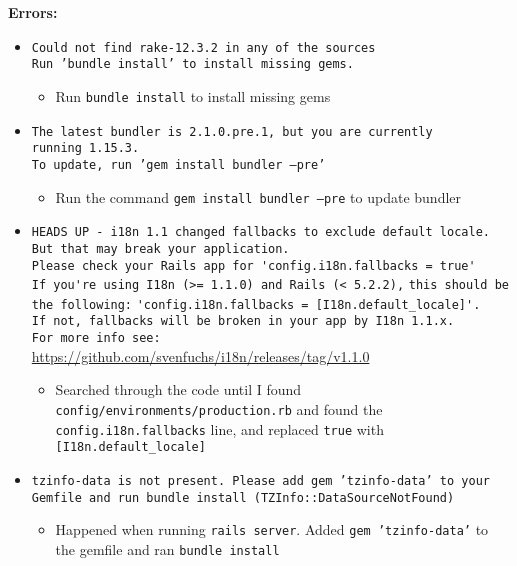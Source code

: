 \documentclass{article}
\begin{document}
\textbf{Errors:}
\begin{itemize}
    \item \texttt{Could not find rake-12.3.2 in any of the sources\\
    Run 'bundle install' to install missing gems.}
    \begin{itemize}
        \item Run \texttt{bundle install} to install missing gems
    \end{itemize}
    \item \texttt{The latest bundler is 2.1.0.pre.1, but you are currently\\ running 1.15.3.\\
    To update, run 'gem install bundler --pre'}
    \begin{itemize}
        \item Run the command \texttt{gem install bundler --pre} to update bundler
    \end{itemize}
    \item \verb|HEADS UP - i18n 1.1 changed fallbacks to exclude default locale.|\\
    \verb|But that may break your application.|\\
    \verb|Please check your Rails app for 'config.i18n.fallbacks = true'|\\
    \verb|If you're using I18n (>= 1.1.0) and Rails (< 5.2.2),|
    \verb|this should be the following:| 
    \verb|'config.i18n.fallbacks = [I18n.default_locale]'.|\\
    \verb|If not, fallbacks will be broken in your app by I18n 1.1.x.|\\
    \verb|For more info see:|\\
    \url{https://github.com/svenfuchs/i18n/releases/tag/v1.1.0}
    \begin{itemize}
        \item Searched through the code until I found \texttt{config/environments/production.rb} and found the \texttt{config.i18n.fallbacks} line, and replaced \texttt{true} with \verb|[I18n.default_locale]|
    \end{itemize}
    \item \texttt{tzinfo-data is not present. Please add gem 'tzinfo-data' to your Gemfile and run bundle install (TZInfo::DataSourceNotFound)}
    \begin{itemize}
        \item Happened when running \texttt{rails server}. Added \texttt{gem 'tzinfo-data'} to the gemfile and ran \texttt{bundle install}
    \end{itemize}
\end{itemize}
\end{document}
